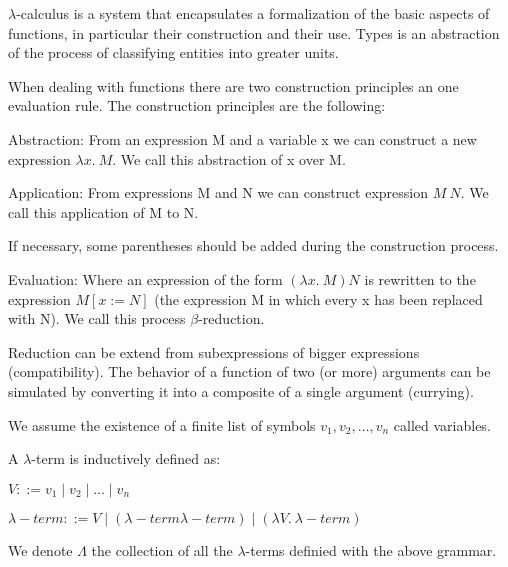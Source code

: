 {\color{red}

$\lambda$-calculus is a system that encapsulates a formalization of the basic aspects of functions, in particular their construction and their use.
Types is an abstraction of the process of classifying entities into greater units.

When dealing with functions there are two construction principles an one evaluation rule. The construction principles are the following:

Abstraction: From an expression M and a variable x we can construct a new expression $\lambda x.\:M$. We call this abstraction of x over M.

Application: From expressions M and N we can construct expression $M\:N$. We call this application of M to N.

If necessary, some parentheses should be added during the construction process.

Evaluation: Where an expression of the form $\left(\lambda x.\:M\right)N$ is rewritten to the expression $M\left[x:=N\right]$ (the expression M in
which every x has been replaced with N). We call this process $\beta$-reduction.

Reduction can be extend from subexpressions of bigger expressions (compatibility). The behavior of a function of two (or more) arguments can
be simulated by converting it into a composite of a single argument (currying).

}

We assume the existence of a finite list of symbols $v_1, v_2, \ldots, v_n$ called variables. 

\begin{definition}

A $\lambda$-term is inductively defined as:

$V ::= v_1 \mid v_2 \mid \ldots \mid v_n$

$\lambda-term ::= V \mid \left( \lambda-term \lambda-term \right) \mid \left( \lambda V.\: \lambda-term \right)$

We denote $\Lambda$ the collection of all the $\lambda$-terms definied with the above grammar.

\end{definition}

